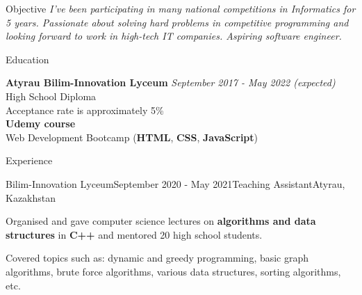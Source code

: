 \documentclass{resume}
\begin{document}
\begin{rSection}{Objective}
{\emph{I've been participating in many national competitions in Informatics for 5 years. Passionate about solving hard problems in competitive programming and looking forward to work in high-tech IT companies. Aspiring software engineer.}}
\end{rSection}


\begin{rSection}{Education}

{\bf Atyrau Bilim-Innovation Lyceum} \hfill {\em September 2017 - May 2022 (expected)} \\ 
High School Diploma\\
Acceptance rate is approximately 5\% \\
{\bf Udemy course} \hfill  \\ 
Web Development Bootcamp (\textbf{HTML}, \textbf{CSS}, \textbf{JavaScript}) \\
\end{rSection}


\begin{rSection}{Experience}


\begin{rSubsection}{Bilim-Innovation Lyceum}{September 2020 - May 2021}{Teaching Assistant}{Atyrau, Kazakhstan}
\item Organised and gave computer science lectures on \textbf{algorithms and data structures} in \textbf{C++} and mentored 20 high school students.
\item Covered topics such as: dynamic and greedy programming, basic graph algorithms, brute force algorithms, various data structures, sorting algorithms, etc.
\end{rSubsection}




\end{rSection}
\end{document}
